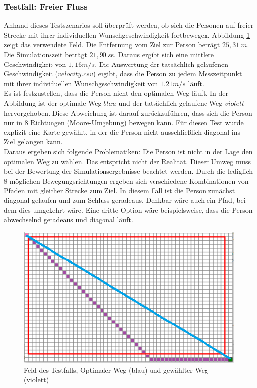 \subsubsection{Testfall: Freier Fluss}
Anhand dieses Testszenarios soll überprüft werden, ob sich die Personen auf freier Strecke mit ihrer individuellen Wunschgeschwindigkeit fortbewegen. Abbildung \ref{fig:freeflowVGLmap} zeigt das verwendete Feld. Die Entfernung vom Ziel zur Person beträgt $25,31\ m$. Die Simulationszeit beträgt $21,90\ s$s. Daraus ergibt sich eine mittlere Geschwindigkeit von $1,16 m/s$. Die Auswertung der tatsächlich gelaufenen Geschwindigkeit ($velocity.csv$) ergibt, dass die Person zu jedem Messzeitpunkt mit ihrer individuellen Wunschgeschwindigkeit von $1.21 m/s$ läuft. \\
Es ist festzustellen, dass die Person nicht den optimalen Weg läuft. In der Abbildung ist der optimale Weg $blau$ und der tatsächlich gelaufene Weg $violett$ hervorgehoben. Diese Abweichung ist darauf zurückzuführen, dass sich die Person nur in 8 Richtungen (Moore-Umgebung) bewegen kann. Für diesen Test wurde explizit eine Karte gewählt, in der die Person nicht ausschließlich diagonal ins Ziel gelangen kann. \\
Daraus ergeben sich folgende Problematiken: Die Person ist nicht in der Lage den optimalen Weg zu wählen. Das entspricht nicht der Realität. Dieser Umweg muss bei der Bewertung der Simulationsergebnisse beachtet werden. Durch die lediglich 8 möglichen Bewegungsrichtungen ergeben sich verschiedene Kombinationen von Pfaden mit gleicher Strecke zum Ziel. In diesem Fall ist die Person zunächst diagonal gelaufen und zum Schluss geradeaus. Denkbar wäre auch ein Pfad, bei dem dies umgekehrt wäre. Eine dritte Option wäre beispielsweise, dass die Person abwechselnd geradeaus und diagonal läuft.

\begin{figure}[ht]
	\centering
	\includegraphics[width=\textwidth]{abbildungen/freeflowVGL.png}
	\caption{Feld des Testfalls, Optimaler Weg (blau) und gewählter Weg (violett)}
	\label{fig:freeflowVGLmap}
\end{figure}